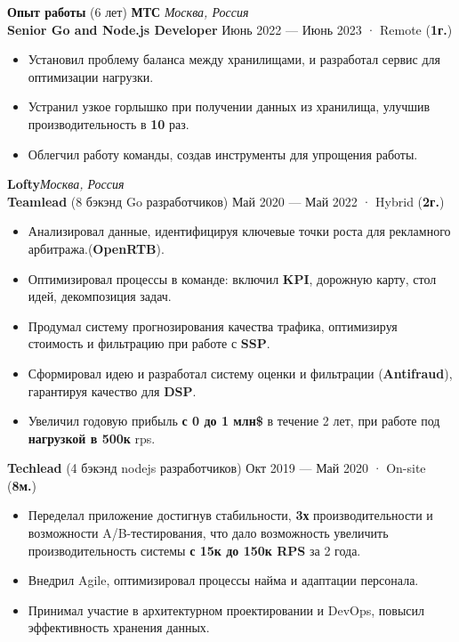 \documentclass{resume}
\begin{document}
\begin{rSection}{\textbf{Опыт работы} (6 лет) }
    \textbf{МТС} \hfill \textit{Москва, Россия} \\
    \textbf{Senior Go and Node.js Developer}  \hfill Июнь 2022 --- Июнь 2023 · Remote ({\textbf{1г.}})
    \begin{itemize}
        \item Установил проблему баланса между хранилищами, и разработал сервис для оптимизации нагрузки.
        \item Устранил узкое горлышко при получении данных из хранилища, улучшив производительность в \textbf{10} раз\@.
        \item Облегчил работу команды, создав инструменты для упрощения работы\@.
    \end{itemize}

    \textbf{Lofty}\hfill \textit{Москва, Россия} \\
    \textbf{Teamlead} (8 бэкэнд Go разработчиков) \hfill Май 2020 --- Май 2022 · Hybrid ({\textbf{2г.}})
    \begin{itemize}
        \item Анализировал данные, идентифицируя ключевые точки роста для рекламного арбитража.(\textbf{OpenRTB})\@.
        \item Оптимизировал процессы в команде: включил \textbf{KPI}, дорожную карту, стол идей, декомпозиция задач\@.
        \item Продумал систему прогнозирования качества трафика, оптимизируя стоимость и фильтрацию при работе с \textbf{SSP}\@.
        \item Сформировал идею и разработал систему оценки и фильтрации (\textbf{Antifraud}), гарантируя качество для \textbf{DSP}\@.
        \item Увеличил годовую прибыль \textbf{с 0 до 1 млн\$} в течение 2 лет, при работе под \textbf{нагрузкой в 500к} rps\@.
    \end{itemize}

    \textbf{Techlead} (4 бэкэнд nodejs разработчиков) \hfill Окт 2019 --- Май 2020 · On-site ({\textbf{8м.}})
    \begin{itemize}
        \item Переделал приложение достигнув стабильности, \textbf{3х} производительности и возможности A/B-тестирования,
        что дало возможность увеличить производительность системы \textbf{с 15к до 150к RPS} за 2 года\@.
        \item Внедрил Agile, оптимизировал процессы найма и адаптации персонала\@.
        \item Принимал участие в архитектурном проектировании и DevOps, повысил эффективность хранения данных\@.
    \end{itemize}


\end{rSection}
\end{document}
